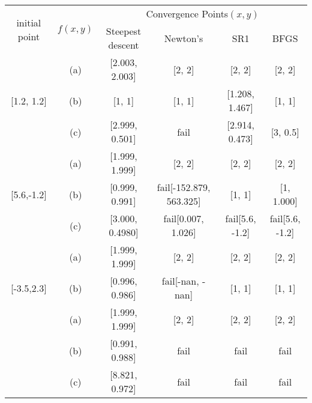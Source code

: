 \documentclass{standalone}
\begin{document}
\begin{center}
    \begin{tabular}{| c | c | c | c | c | c | } \hline
    \multirow{2}{*}{initial point}  & \multirow{2}{*}{$f(x, y)$}   & \multicolumn{4}{c|}{Convergence Points$(x, y)$} \\ \cline{3-6}
                                    &                              & Steepest descent & Newton's & SR1 & BFGS \\ \hline
    \multirow{3}{*}{[1.2, 1.2]}     & (a)                          & [2.003, 2.003]   & [2, 2]   & [2, 2] & [2, 2]  \\ 
                                    & (b)                          & [1, 1]           & [1, 1]   & [1.208, 1.467] & [1, 1] \\ 
                                    & (c)                          & [2.999, 0.501]   & fail     & [2.914, 0.473] & [3, 0.5]\\ \hline
    \multirow{3}{*}{[5.6,-1.2]}     & (a)                          & [1.999, 1.999]   & [2, 2] & [2, 2] & [2, 2] \\ 
                                    & (b)                          & [0.999, 0.991]   & fail[-152.879, 563.325] & [1, 1] & [1, 1.000] \\ 
                                    & (c)                          & [3.000, 0.4980]  & fail[0.007, 1.026] & fail[5.6, -1.2] & fail[5.6, -1.2] \\ \hline
    \multirow{3}{*}{[-3.5,2.3]}     & (a)                          & [1.999, 1.999]   & [2, 2] & [2, 2] & [2, 2] \\ 
                                    & (b)                          & [0.996, 0.986]   & fail[-nan, -nan] & [1, 1] & [1, 1] \\ \hline
    \multirow{3}{*}{[10.5,-8.3]}    & (a)                          & [1.999, 1.999]   & [2, 2] & [2, 2] & [2, 2] \\ 
                                    & (b)                          & [0.991, 0.988]   & fail & fail & fail \\ 
                                    & (c)                          & [8.821, 0.972]   & fail & fail & fail \\ \hline
                                    
    \end{tabular}
\end{center}
\end{document}
